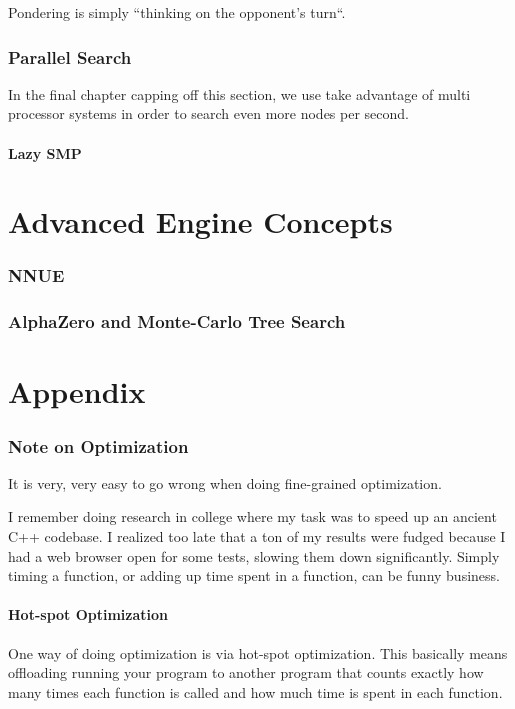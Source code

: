 \documentclass[letterpaper,11pt]{article}
\begin{document}
Pondering is simply ``thinking on the opponent's turn``.

\section{Parallel Search}

In the final chapter capping off this section, we use take advantage of multi processor systems in order to 
search even more nodes per second.

\subsection{Lazy SMP}

\newpage
\part{Advanced Engine Concepts}

\section{NNUE}

\section{AlphaZero and Monte-Carlo Tree Search}

\newpage
\part{Appendix}
\section{Note on Optimization}

It is very, very easy to go wrong when doing fine-grained optimization.

I remember doing research in college where my task was to speed up an ancient C++ codebase. I realized too late that a ton of my results were fudged because I had a web browser open for some tests, slowing them down significantly. Simply timing a function, or adding up time spent in a function, can be funny business.

\subsection{Hot-spot Optimization}

One way of doing optimization is via hot-spot optimization. This basically means offloading running your program to another program that counts exactly how many times each function is called and how much time is spent in each function.
\end{document}
